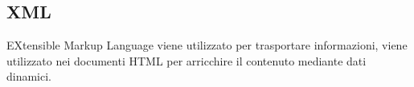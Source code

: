 \subsection{XML}
EXtensible Markup Language viene utilizzato per trasportare informazioni, viene utilizzato nei documenti HTML per arricchire il contenuto mediante dati dinamici.

